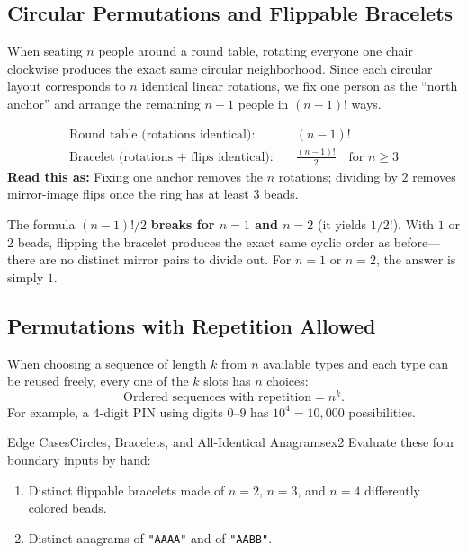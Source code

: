 \documentclass[11pt,a4paper]{article}
\theoremstyle{definition}
\begin{document}
\subsection{Circular Permutations and Flippable Bracelets}

When seating $n$ people around a round table, rotating everyone one chair clockwise produces the exact same circular neighborhood. Since each circular layout corresponds to $n$ identical linear rotations, we fix one person as the ``north anchor'' and arrange the remaining $n - 1$ people in $(n - 1)!$ ways.

\begin{formulabox}
\begin{align*}
    \text{Round table (rotations identical):}\quad & (n - 1)! \\
    \text{Bracelet (rotations + flips identical):}\quad & \frac{(n - 1)!}{2} \quad \text{for } n \ge 3
\end{align*}
\textbf{Read this as:} Fixing one anchor removes the $n$ rotations; dividing by $2$ removes mirror-image flips once the ring has at least $3$ beads.
\end{formulabox}

\begin{watchoutbox}[Watch Out --- Small Bracelets ($n = 1$ and $n = 2$)]
The formula $(n - 1)! / 2$ \textbf{breaks for $n = 1$ and $n = 2$} (it yields $1/2$!). With $1$ or $2$ beads, flipping the bracelet produces the exact same cyclic order as before---there are no distinct mirror pairs to divide out. For $n = 1$ or $n = 2$, the answer is simply $1$.
\end{watchoutbox}

\subsection{Permutations with Repetition Allowed}

When choosing a sequence of length $k$ from $n$ available types and each type can be reused freely, every one of the $k$ slots has $n$ choices:
\[
    \text{Ordered sequences with repetition} = n^k.
\]
For example, a $4$-digit PIN using digits $0$--$9$ has $10^4 = 10{,}000$ possibilities.

\begin{tryitbox}{Edge Cases}{Circles, Bracelets, and All-Identical Anagrams}{ex2}
Evaluate these four boundary inputs by hand:
\begin{enumerate}
    \item Distinct flippable bracelets made of $n = 2$, $n = 3$, and $n = 4$ differently colored beads.
    \item Distinct anagrams of \texttt{"AAAA"} and of \texttt{"AABB"}.
\end{enumerate}
\end{tryitbox}
\end{document}
